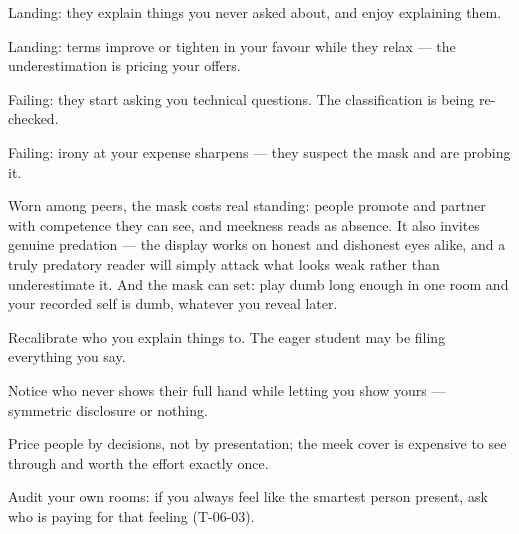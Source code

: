 \begin{feedback}
  \item Landing: they explain things you never asked about, and enjoy explaining them.
  \item Landing: terms improve or tighten in your favour while they relax --- the underestimation is pricing your offers.
  \item Failing: they start asking you technical questions. The classification is being re-checked.
  \item Failing: irony at your expense sharpens --- they suspect the mask and are probing it.
\end{feedback}
\begin{failure}
Worn among peers, the mask costs real standing: people promote and partner with competence they can see, and meekness reads as absence. It also invites genuine predation --- the display works on honest and dishonest eyes alike, and a truly predatory reader will simply attack what looks weak rather than underestimate it. And the mask can set: play dumb long enough in one room and your recorded self is dumb, whatever you reveal later.
\end{failure}
\begin{countermeasures}
  \item Recalibrate who you explain things to. The eager student may be filing everything you say.
  \item Notice who never shows their full hand while letting you show yours --- symmetric disclosure or nothing.
  \item Price people by decisions, not by presentation; the meek cover is expensive to see through and worth the effort exactly once.
  \item Audit your own rooms: if you always feel like the smartest person present, ask who is paying for that feeling (T-06-03).
\end{countermeasures}

\seesources
{}
